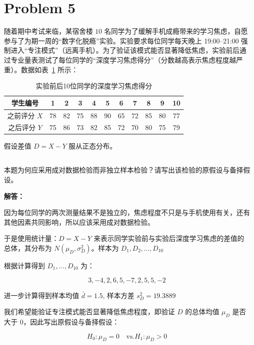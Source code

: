 \documentclass[12pt,a4paper]{article}
\begin{document}
\section{Problem 5}

随着期中考试来临，某宿舍楼 $10$ 名同学为了缓解手机成瘾带来的学习焦虑，自愿参与了为期一周的“数字化脱瘾”实验。实验要求每位同学每天晚上 19:00--21:00 强制进入“专注模式”（远离手机）。为了验证该模式能否显著降低焦虑，实验前后通过专业量表测试了每位同学的“深度学习焦虑得分”（分数越高表示焦虑程度越严重）。数据如表~\ref{tab:anxiety} 所示：

\begin{table}[htbp]
\centering
\caption{实验前后10位同学的深度学习焦虑得分}
\label{tab:anxiety}
\renewcommand{\arraystretch}{1.25}
\begin{tabular}{c*{10}{c}}
\toprule
学生编号 & 1 & 2 & 3 & 4 & 5 & 6 & 7 & 8 & 9 & 10 \\
\midrule
之前评分 $X$ & 78 & 82 & 75 & 88 & 90 & 65 & 72 & 85 & 80 & 77 \\
之后评分 $Y$ & 75 & 86 & 73 & 82 & 85 & 72 & 70 & 80 & 75 & 79 \\
\bottomrule
\end{tabular}
\end{table}

假设差值 $D=X-Y$ 服从正态分布。

\subsection{}

本题为何应采用成对数据检验而非独立样本检验？请写出该检验的原假设与备择假设。

\begin{answerbox}
\textbf{解答：}

因为每位同学的两次测量结果不是独立的，焦虑程度不只是与手机使用有关，还有其他因素共同影响，所以应该采用成对数据检验。

于是使用统计量：$D = X - Y$ 来表示同学实验前与实验后深度学习焦虑的差值的总体，其分布为 $N(\mu_D, \sigma_D^2)$。样本为 $D_1, D_2, \ldots, D_{10}$

根据计算得到 ${D_1, \ldots, D_{10}}$ 为：

$$
{3, -4, 2, 6, 5, -7, 2, 5, 5, -2}
$$

进一步计算得到样本均值 $\bar{d} = 1.5$, 样本方差 $s_D^2 = 19.3889$

我们希望能验证专注模式能否显著降低焦虑程度，即验证 $D$ 的总体均值 $\mu_D$ 是否大于 $0$，因此写出原假设与备择假设：

$$
H_0: \mu_D = 0 \quad \text{vs.}  H_1: \mu_D > 0
$$
\end{answerbox}
\end{document}
